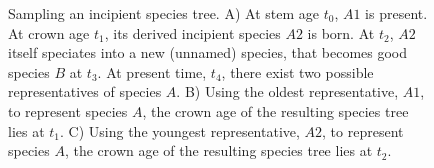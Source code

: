 \documentclass{article}
\begin{document}
\begin{figure}
  \centering 
  \CreateTikzFigureSampling{}
  \caption{
    Sampling an incipient species tree. 
    A) At stem age $t_0$, $A1$ is present.
    At crown age $t_1$, its derived incipient species $A2$ is born. 
    At $t_2$, $A2$ itself speciates into a new (unnamed) species, 
    that becomes good species $B$ at $t_3$. At present time, $t_4$, there
    exist two possible representatives of species $A$. 
    B) Using the oldest representative, $A1$, to represent species $A$, the crown
    age of the resulting species tree lies at $t_1$. 
    C) Using the youngest representative, $A2$, to represent species $A$, the crown
    age of the resulting species tree lies at $t_2$. 
  }
  \label{fig:sampling}
\end{figure}

\listoftodos
\end{document}
